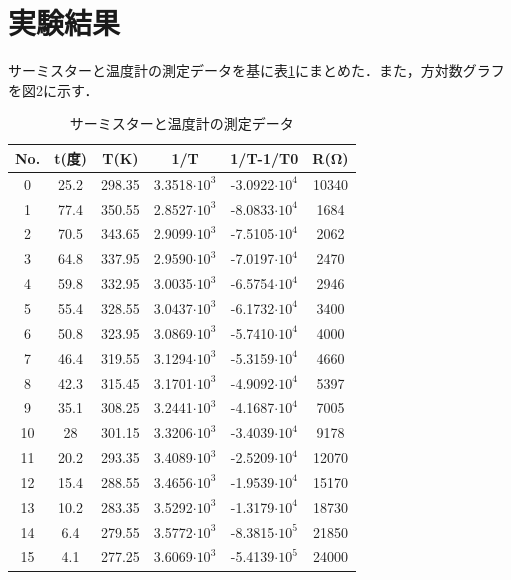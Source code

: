 \documentclass[a4paper,11pt]{ltjsarticle}
\begin{document}
\section{実験結果}
サーミスターと温度計の測定データを基に表\ref{tab:result}にまとめた．また，方対数グラフを図2に示す．
\begin{table}[H]
  \centering
  \caption{サーミスターと温度計の測定データ}
  \label{tab:result}
  \begin{tabular}{|c|c|c|c|c|c|}
    \hline
    No. & t(度) & T(K)   & 1/T                 & 1/T-1/T0             & R(Ω)  \\
    \hline
    0   & 25.2 & 298.35 & 3.3518$\cdot 10 ^3$ & -3.0922$\cdot 10 ^4$ & 10340 \\\hline
    1   & 77.4 & 350.55 & 2.8527$\cdot 10 ^3$ & -8.0833$\cdot 10 ^4$ & 1684  \\\hline
    2   & 70.5 & 343.65 & 2.9099$\cdot 10 ^3$ & -7.5105$\cdot 10 ^4$ & 2062  \\\hline
    3   & 64.8 & 337.95 & 2.9590$\cdot 10 ^3$ & -7.0197$\cdot 10 ^4$ & 2470  \\\hline
    4   & 59.8 & 332.95 & 3.0035$\cdot 10 ^3$ & -6.5754$\cdot 10 ^4$ & 2946  \\\hline
    5   & 55.4 & 328.55 & 3.0437$\cdot 10 ^3$ & -6.1732$\cdot 10 ^4$ & 3400  \\\hline
    6   & 50.8 & 323.95 & 3.0869$\cdot 10 ^3$ & -5.7410$\cdot 10 ^4$ & 4000  \\\hline
    7   & 46.4 & 319.55 & 3.1294$\cdot 10 ^3$ & -5.3159$\cdot 10 ^4$ & 4660  \\\hline
    8   & 42.3 & 315.45 & 3.1701$\cdot 10 ^3$ & -4.9092$\cdot 10 ^4$ & 5397  \\\hline
    9   & 35.1 & 308.25 & 3.2441$\cdot 10 ^3$ & -4.1687$\cdot 10 ^4$ & 7005  \\\hline
    10  & 28   & 301.15 & 3.3206$\cdot 10 ^3$ & -3.4039$\cdot 10 ^4$ & 9178  \\\hline
    11  & 20.2 & 293.35 & 3.4089$\cdot 10 ^3$ & -2.5209$\cdot 10 ^4$ & 12070 \\\hline
    12  & 15.4 & 288.55 & 3.4656$\cdot 10 ^3$ & -1.9539$\cdot 10 ^4$ & 15170 \\\hline
    13  & 10.2 & 283.35 & 3.5292$\cdot 10 ^3$ & -1.3179$\cdot 10 ^4$ & 18730 \\\hline
    14  & 6.4  & 279.55 & 3.5772$\cdot 10 ^3$ & -8.3815$\cdot 10 ^5$ & 21850 \\\hline
    15  & 4.1  & 277.25 & 3.6069$\cdot 10 ^3$ & -5.4139$\cdot 10 ^5$ & 24000 \\\hline
  \end{tabular}
\end{table}
\end{document}

